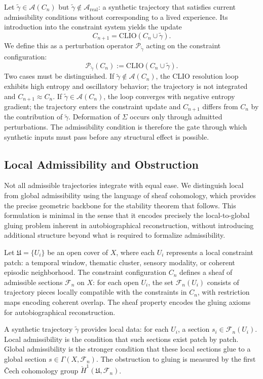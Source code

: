 \documentclass[12pt, a4paper]{article}
\begin{document}
Let $\tilde{\gamma} \in \mathcal{A}(C_n)$ but $\tilde{\gamma} \notin \mathcal{A}_{\mathrm{real}}$: a synthetic trajectory that satisfies current admissibility conditions without corresponding to a lived experience. Its introduction into the constraint system yields the update
\[
C_{n+1} = \mathrm{CLIO}(C_n \cup \tilde{\gamma}).
\]
We define this as a perturbation operator $\mathcal{P}_{\tilde{\gamma}}$ acting on the constraint configuration:
\[
\mathcal{P}_{\tilde{\gamma}}(C_n) := \mathrm{CLIO}(C_n \cup \tilde{\gamma}).
\]
Two cases must be distinguished. If $\tilde{\gamma} \notin \mathcal{A}(C_n)$, the CLIO resolution loop exhibits high entropy and oscillatory behavior; the trajectory is not integrated and $C_{n+1} \approx C_n$. If $\tilde{\gamma} \in \mathcal{A}(C_n)$, the loop converges with negative entropy gradient; the trajectory enters the constraint update and $C_{n+1}$ differs from $C_n$ by the contribution of $\tilde{\gamma}$. Deformation of $\Sigma$ occurs only through admitted perturbations. The admissibility condition is therefore the gate through which synthetic inputs must pass before any structural effect is possible.

\subsection{Local Admissibility and Obstruction}

Not all admissible trajectories integrate with equal ease. We distinguish local from global admissibility using the language of sheaf cohomology, which provides the precise geometric backbone for the stability theorem that follows. This formulation is minimal in the sense that it encodes precisely the local-to-global gluing problem inherent in autobiographical reconstruction, without introducing additional structure beyond what is required to formalize admissibility.

Let $\mathfrak{U} = \{U_i\}$ be an open cover of $X$, where each $U_i$ represents a local constraint patch: a temporal window, thematic cluster, sensory modality, or coherent episodic neighborhood. The constraint configuration $C_n$ defines a sheaf of admissible sections $\mathcal{F}_n$ on $X$: for each open $U_i$, the set $\mathcal{F}_n(U_i)$ consists of trajectory pieces locally compatible with the constraints in $C_n$, with restriction maps encoding coherent overlap. The sheaf property encodes the gluing axioms for autobiographical reconstruction.

A synthetic trajectory $\tilde{\gamma}$ provides local data: for each $U_i$, a section $s_i \in \mathcal{F}_n(U_i)$. Local admissibility is the condition that such sections exist patch by patch. Global admissibility is the stronger condition that these local sections glue to a global section $s \in \Gamma(X, \mathcal{F}_n)$. The obstruction to gluing is measured by the first \v{C}ech cohomology group $\check{H}^1(\mathfrak{U}, \mathcal{F}_n)$.
\end{document}
